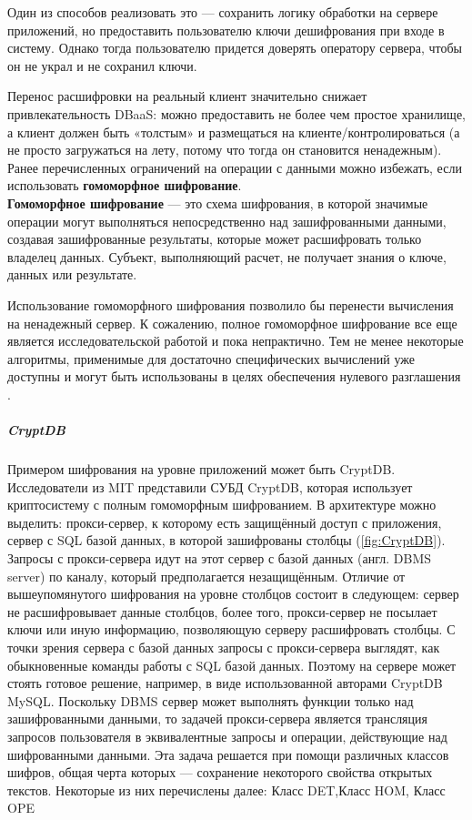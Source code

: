 Один из способов реализовать это — сохранить логику обработки на сервере приложений, но
предоставить пользователю ключи дешифрования при входе в систему. Однако тогда пользователю
придется доверять оператору сервера, чтобы он не украл и не сохранил ключи.

Перенос расшифровки на реальный клиент значительно снижает привлекательность DBaaS: можно
предоставить не более чем простое хранилище, а клиент должен быть «толстым» и размещаться на
клиенте/контролироваться (а не просто загружаться на лету, потому что тогда он становится
ненадежным). \\

Ранее перечисленных ограничений на операции с данными можно избежать, если использовать
\textbf{гомоморфное шифрование}. \\

\textbf{Гомоморфное шифрование} — это схема шифрования, в которой значимые операции могут выполняться
непосредственно над зашифрованными данными, создавая зашифрованные результаты, которые может
расшифровать только владелец данных. Субъект, выполняющий расчет, не получает знания о ключе,
данных или результате.

Использование гомоморфного шифрования позволило бы перенести вычисления на ненадежный сервер.
К сожалению, полное гомоморфное шифрование все еще является исследовательской работой и пока
непрактично. Тем не менее некоторые алгоритмы, применимые для достаточно специфических вычислений
уже доступны и могут быть использованы в целях обеспечения нулевого разглашения \cite{zkd}.

\subparagraph{CryptDB}

Примером шифрования на уровне приложений может быть CryptDB. Исследователи из MIT представили СУБД CryptDB, которая использует криптосистему с полным гомоморфным шифрованием. В архитектуре можно выделить: прокси-сервер, к которому есть защищённый доступ с приложения, сервер с SQL базой данных, в которой зашифрованы столбцы (\ref{fig:CryptDB}). Запросы с прокси-сервера идут на этот сервер с базой данных (англ. DBMS server) по каналу, который предполагается незащищённым. Отличие от вышеупомянутого шифрования на уровне столбцов состоит в следующем: сервер не расшифровывает данные столбцов, более того, прокси-сервер не посылает ключи или иную информацию, позволяющую серверу расшифровать столбцы. С точки зрения сервера с базой данных запросы с прокси-сервера выглядят, как обыкновенные команды работы с SQL базой данных. Поэтому на сервере может стоять готовое решение, например, в виде использованной авторами CryptDB MySQL. Поскольку DBMS сервер может выполнять функции только над зашифрованными данными, то задачей прокси-сервера является трансляция запросов пользователя в эквивалентные запросы и операции, действующие над шифрованными данными. Эта задача решается при помощи различных классов шифров, общая черта которых — сохранение некоторого свойства открытых текстов. Некоторые из них перечислены далее: Класс DET,Класс HOM, Класс OPE \cite{CryptDB}\cite{MIT-CryptDB}


